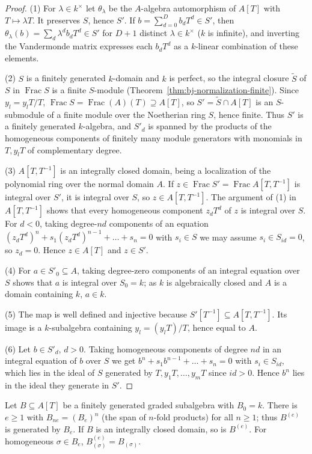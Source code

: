 \begin{proof}
(1) For $\lambda\in k^\times$ let $\theta_\lambda$ be the $A$-algebra automorphism of $A[T]$ with
$T\mapsto\lambda T$. It preserves $S$, hence $S'$. If $b=\sum_{d=0}^Db_dT^d\in S'$, then
$\theta_\lambda(b)=\sum_d\lambda^db_dT^d\in S'$ for $D+1$ distinct $\lambda\in k^\times$ ($k$ is infinite), and
inverting the Vandermonde matrix expresses each $b_dT^d$ as a $k$-linear combination of these elements.

(2) $S$ is a finitely generated $k$-domain and $k$ is perfect, so the integral closure $\widetilde S$ of $S$ in
$\operatorname{Frac}S$ is a finite $S$-module (Theorem~\ref{thm:bj-normalization-finite}). Since $y_l=y_lT/T$,
$\operatorname{Frac}S=\operatorname{Frac}(A)(T)\supseteq A[T]$, so $S'=\widetilde S\cap A[T]$ is an $S$-submodule
of a finite module over the Noetherian ring $S$, hence finite. Thus $S'$ is a finitely generated $k$-algebra,
and $S'_d$ is spanned by the products of the homogeneous components of finitely many module generators with
monomials in $T,y_lT$ of complementary degree.

(3) $A[T,T^{-1}]$ is an integrally closed domain, being a localization of the polynomial ring over the normal
domain $A$. If $z\in\operatorname{Frac}S'=\operatorname{Frac}A[T,T^{-1}]$ is integral over $S'$, it is integral
over $S$, so $z\in A[T,T^{-1}]$. The argument of (1) in $A[T,T^{-1}]$ shows that every homogeneous component
$z_dT^d$ of $z$ is integral over $S$. For $d<0$, taking degree-$nd$ components of an equation
$(z_dT^d)^n+s_1(z_dT^d)^{n-1}+\dots+s_n=0$ with $s_i\in S$ we may assume $s_i\in S_{id}=0$, so $z_d=0$. Hence
$z\in A[T]$ and $z\in S'$.

(4) For $a\in S'_0\subseteq A$, taking degree-zero components of an integral equation over $S$ shows that $a$ is
integral over $S_0=k$; as $k$ is algebraically closed and $A$ is a domain containing $k$, $a\in k$.

(5) The map is well defined and injective because $S'[T^{-1}]\subseteq A[T,T^{-1}]$. Its image is a
$k$-subalgebra containing $y_l=(y_lT)/T$, hence equal to $A$.

(6) Let $b\in S'_d$, $d>0$. Taking homogeneous components of degree $nd$ in an integral equation of $b$ over $S$
we get $b^n+s_1b^{n-1}+\dots+s_n=0$ with $s_i\in S_{id}$, which lies in the ideal of $S$ generated by
$T,y_1T,\dots,y_mT$ since $id>0$. Hence $b^n$ lies in the ideal they generate in $S'$.
\end{proof}

\begin{lemma}\label{lem:wu-veronese}
\leanok
{}
Let $B\subseteq A[T]$ be a finitely generated graded subalgebra with $B_0=k$. There is $e\ge1$ with
$B_{ne}=(B_e)^n$ (the span of $n$-fold products) for all $n\ge1$; thus $B^{(e)}$ is generated by $B_e$. If $B$ is
an integrally closed domain, so is $B^{(e)}$. For homogeneous $\sigma\in B_e$, $B^{(e)}_{(\sigma)}=B_{(\sigma)}$.
\end{lemma}

